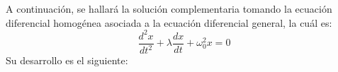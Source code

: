 \begin{multicols}{2}
A continuación, se hallará la solución complementaria tomando la ecuación diferencial homogénea asociada a la ecuación diferencial general, la cuál es:
\begin{equation}
    \frac{d^{2}x}{dt^{2}} + \lambda \frac{dx}{dt} + \omega_{0}^{2}x = 0 \label{pro5:eq1}
\end{equation}
Su desarrollo es el siguiente:


\end{multicols}

